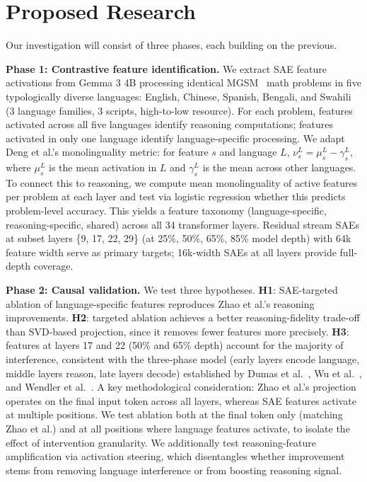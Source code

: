 \documentclass[10pt,twocolumn,a4paper]{article}
\begin{document}
\section{Proposed Research}

Our investigation will consist of three phases, each building on the previous.

\textbf{Phase 1: Contrastive feature identification.} We extract SAE feature activations from Gemma 3 4B processing identical MGSM~\cite{mgsm} math problems in five typologically diverse languages: English, Chinese, Spanish, Bengali, and Swahili (3 language families, 3 scripts, high-to-low resource). For each problem, features activated across all five languages identify reasoning computations; features activated in only one language identify language-specific processing. We adapt Deng et al.'s monolinguality metric: for feature $s$ and language $L$, $\nu_s^L = \mu_s^L - \gamma_s^L$, where $\mu_s^L$ is the mean activation in $L$ and $\gamma_s^L$ is the mean across other languages. To connect this to reasoning, we compute mean monolinguality of active features per problem at each layer and test via logistic regression whether this predicts problem-level accuracy. This yields a feature taxonomy (language-specific, reasoning-specific, shared) across all 34 transformer layers. Residual stream SAEs at subset layers \{9, 17, 22, 29\} (at 25\%, 50\%, 65\%, 85\% model depth) with 64k feature width serve as primary targets; 16k-width SAEs at all layers provide full-depth coverage.

\textbf{Phase 2: Causal validation.} We test three hypotheses. \textbf{H1}: SAE-targeted ablation of language-specific features reproduces Zhao et al.'s reasoning improvements. \textbf{H2}: targeted ablation achieves a better reasoning-fidelity trade-off than SVD-based projection, since it removes fewer features more precisely. \textbf{H3}: features at layers 17 and 22 (50\% and 65\% depth) account for the majority of interference, consistent with the three-phase model (early layers encode language, middle layers reason, late layers decode) established by Dumas et al.~\cite{dumas}, Wu et al.~\cite{wu}, and Wendler et al.~\cite{wendler}. A key methodological consideration: Zhao et al.'s projection operates on the final input token across all layers, whereas SAE features activate at multiple positions. We test ablation both at the final token only (matching Zhao et al.) and at all positions where language features activate, to isolate the effect of intervention granularity. We additionally test reasoning-feature amplification via activation steering, which disentangles whether improvement stems from removing language interference or from boosting reasoning signal.
\end{document}
